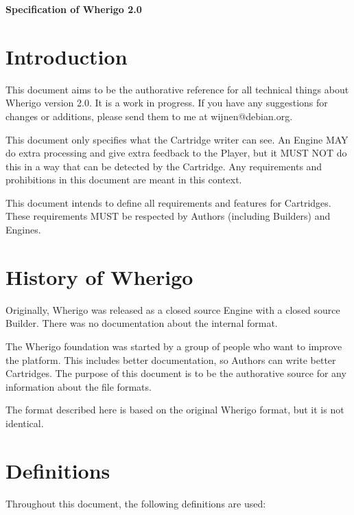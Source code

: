 \documentclass{article}
\begin{document}
\textbf{\Large Specification of Wherigo 2.0}

\tableofcontents

\section{Introduction}
This document aims to be the authorative reference for all technical things
about Wherigo version 2.0. It is a work in progress. If you have any
suggestions for changes or additions, please send them to me at
wijnen@debian.org.

This document only specifies what the Cartridge writer can see. An Engine MAY
do extra processing and give extra feedback to the Player, but it MUST NOT do
this in a way that can be detected by the Cartridge. Any requirements and
prohibitions in this document are meant in this context.

This document intends to define all requirements and features for Cartridges.
These requirements MUST be respected by Authors (including Builders) and
Engines.


\section{History of Wherigo}
Originally, Wherigo was released as a closed source Engine with a closed source
Builder. There was no documentation about the internal format.

The Wherigo foundation was started by a group of people who want to improve the
platform.  This includes better documentation, so Authors can write better
Cartridges.  The purpose of this document is to be the authorative source for
any information about the file formats.

The format described here is based on the original Wherigo format, but it is
not identical.


\section{Definitions}
Throughout this document, the following definitions are used:
\end{document}
